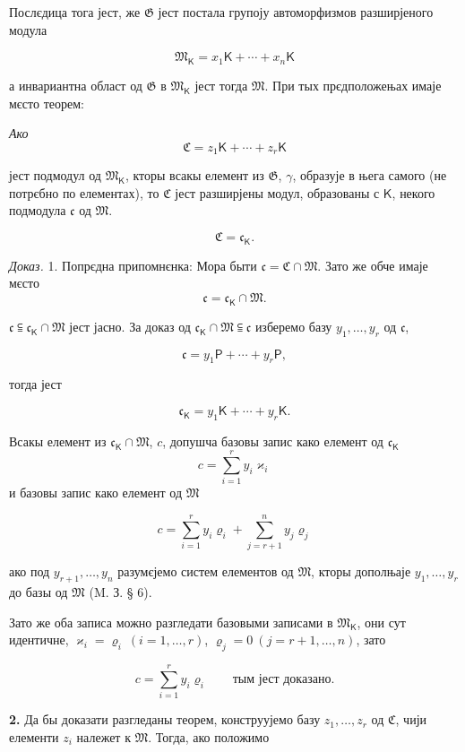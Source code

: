 \documentclass[11pt]{article}
\begin{document}
Послєдица тога јест, же \(\mathfrak G\) јест постала групоју автоморфизмов разширјеного модула

\[
\mathfrak M_{\mathsf K}=x_1\mathsf K+\cdots+x_n\mathsf K
\]

а инвариантна област од \(\mathfrak G\) в \(\mathfrak M_{\mathsf K}\) јест тогда \(\mathfrak M\). При тых прєдположењах имаје мєсто теорем:

\begingroup\itshape
Ако
\[
\mathfrak C=z_1\mathsf K+\cdots+z_r\mathsf K
\]

јест подмодул од \(\mathfrak M_{\mathsf K}\), кторы всакы елемент из \(\mathfrak G\), \(\gamma\), образује в њега самого (не потрєбно по елементах), то \(\mathfrak C\) јест разширјены модул, образованы с \(\mathsf K\), некого подмодула \(\mathfrak c\) од \(\mathfrak M\).

\[
\mathfrak C=\mathfrak c_{\mathsf K}.
\]
\endgroup

\emph{Доказ.} 1. Попрєдна припомнєнка: Мора быти \(\mathfrak c=\mathfrak C\cap\mathfrak M\). Зато же обче имаје мєсто
\[
\mathfrak c=\mathfrak c_{\mathsf K}\cap\mathfrak M.
\]

\(\mathfrak c\subseteqq\mathfrak c_{\mathsf K}\cap\mathfrak M\) јест јасно. За доказ од \(\mathfrak c_{\mathsf K}\cap\mathfrak M\subseteqq\mathfrak c\) изберемо базу \(y_1,\ldots,y_r\) од \(\mathfrak c\),

\[
\mathfrak c=y_1\mathsf P+\cdots+y_r\mathsf P,
\]

тогда јест

\[
\mathfrak c_{\mathsf K}=y_1\mathsf K+\cdots+y_r\mathsf K.
\]

Всакы елемент из \(\mathfrak c_{\mathsf K}\cap\mathfrak M\), \(c\), допушча базовы запис како елемент од \(\mathfrak c_{\mathsf K}\)
\[
c=\sum_{i=1}^{r}y_i\varkappa_i
\]
и базовы запис како елемент од \(\mathfrak M\)

\[
c=\sum_{i=1}^{r}y_i\varrho_i+\sum_{j=r+1}^{n}y_j\varrho_j
\]

ако под \(y_{r+1},\ldots,y_n\) разумєјемо систем елементов од \(\mathfrak M\), кторы дополњаје \(y_1,\ldots,y_r\) до базы од \(\mathfrak M\) (M. З. § 6).

Зато же оба записа можно разгледати базовыми записами в \(\mathfrak M_{\mathsf K}\), они сут идентичне, \(\varkappa_i=\varrho_i\ (i=1,\ldots,r)\), \(\varrho_j=0\ (j=r+1,\ldots,n)\), зато

\[
c=\sum_{i=1}^{r}y_i\varrho_i
\qquad\text{тым јест доказано.}
\]

\textbf{2.} Да бы доказати разгледаны теорем, конструујемо базу \(z_1,\ldots,z_r\) од \(\mathfrak C\), чији елементи \(z_i\) належет к \(\mathfrak M\). Тогда, ако положимо
\end{document}
